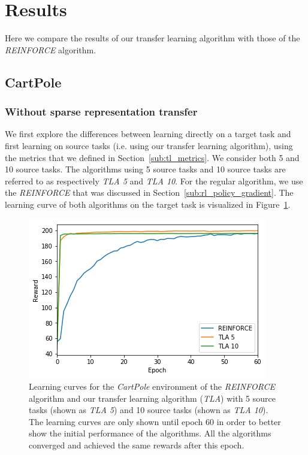 \section{Results}
Here we compare the results of our transfer learning algorithm with those of the \textit{REINFORCE} algorithm.
\subsection{CartPole} %
\label{sub:cartpole}
\subsubsection{Without sparse representation transfer} %
\label{ssub:cartpole:without_sparse_representation_transfer}
We first explore the differences between learning directly on a target task and first learning on source tasks (i.e. using our transfer learning algorithm), using the metrics that we defined in Section~\ref{sub:tl_metrics}. We consider both 5 and 10 source tasks. The algorithms using 5 source tasks and 10 source tasks are referred to as respectively \textit{TLA 5} and \textit{TLA 10}.
For the regular algorithm, we use the \textit{REINFORCE} that was discussed in Section~\ref{sub:rl_policy_gradient}. The learning curve of both algorithms on the target task is visualized in Figure~\ref{fig:CartPole:reward_target_re-akt5-akt10}.
\begin{figure}[H]
    \centering
    \includegraphics[width=.8\linewidth]{images/results/CartPole/no_sparse_transfer/reward_target_re-akt5-akt10.png}
    \caption[Learning curves for \textit{REINFORCE} and \textit{TLA} for the \emph{CartPole} environment]{Learning curves for the \textit{CartPole} environment of the \textit{REINFORCE} algorithm and our transfer learning algorithm (\textit{TLA}) with 5 source tasks (shown as \textit{TLA 5}) and 10 source tasks (shown as \textit{TLA 10}). The learning curves are only shown until epoch 60 in order to better show the initial performance of the algorithms. All the algorithms converged and achieved the same rewards after this epoch.}
    \label{fig:CartPole:reward_target_re-akt5-akt10}
\end{figure}
